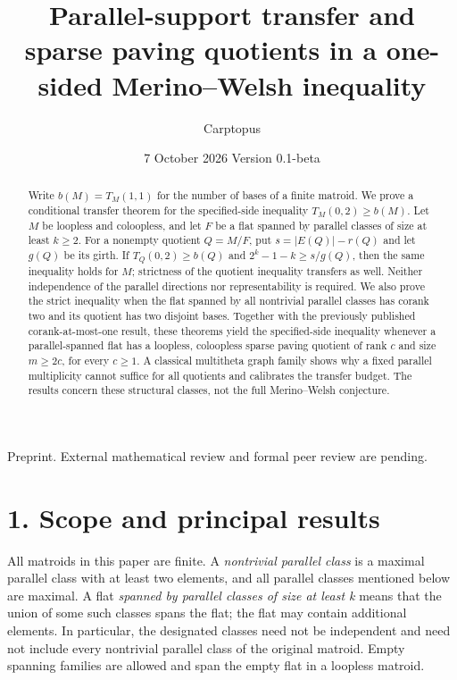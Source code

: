 \documentclass[11pt]{article}
\title{Parallel-support transfer and sparse paving quotients in a one-sided Merino--Welsh inequality}
\author{Carptopus}
\date{7 October 2026 \textperiodcentered{} Version 0.1-beta}
\begin{document}
\maketitle
\begin{center}
Preprint. External mathematical review and formal peer review are pending.
\end{center}

\begin{abstract}

Write \(b(M)=T_M(1,1)\) for the number of bases of a finite matroid. We prove a conditional transfer theorem for the specified-side inequality \(T_M(0,2)\ge b(M)\). Let \(M\) be loopless and coloopless, and let \(F\) be a flat spanned by parallel classes of size at least \(k\ge2\). For a nonempty quotient \(Q=M/F\), put \(s=|E(Q)|-r(Q)\) and let \(g(Q)\) be its girth. If \(T_Q(0,2)\ge b(Q)\) and \(2^k-1-k\ge s/g(Q)\), then the same inequality holds for \(M\); strictness of the quotient inequality transfers as well. Neither independence of the parallel directions nor representability is required. We also prove the strict inequality when the flat spanned by all nontrivial parallel classes has corank two and its quotient has two disjoint bases. Together with the previously published corank-at-most-one result, these theorems yield the specified-side inequality whenever a parallel-spanned flat has a loopless, coloopless sparse paving quotient of rank \(c\) and size \(m\ge2c\), for every \(c\ge1\). A classical multitheta graph family shows why a fixed parallel multiplicity cannot suffice for all quotients and calibrates the transfer budget. The results concern these structural classes, not the full Merino--Welsh conjecture.

\end{abstract}
\section*{1. Scope and principal results}

All matroids in this paper are finite. A \emph{nontrivial parallel class} is a maximal parallel class with at least two elements, and all parallel classes mentioned below are maximal. A flat \emph{spanned by parallel classes of size at least k} means that the union of some such classes spans the flat; the flat may contain additional elements. In particular, the designated classes need not be independent and need not include every nontrivial parallel class of the original matroid. Empty spanning families are allowed and span the empty flat in a loopless matroid.
\end{document}
